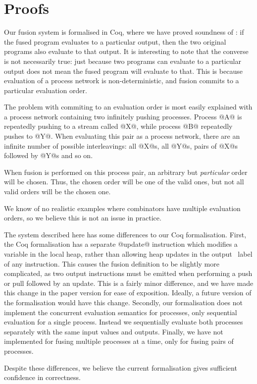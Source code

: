
\section{Proofs}
\label{s:Proofs}

Our fusion system is formalised in Coq, where we have proved soundness of : if the fused program evaluates to a particular output, then the two original programs also evaluate to that output.
It is interesting to note that the converse is not necessarily true: just because two programs can evaluate to a particular output does not mean the fused program will evaluate to that.
This is because evaluation of a process network is non-deterministic, and fusion commits to a particular evaluation order.

The problem with commiting to an evaluation order is most easily explained with a process network containing two infinitely pushing processes.
Process @A@ is repeatedly pushing to a stream called @X@, while process @B@ repeatedly pushes to @Y@.
When evaluating this pair as a process network, there are an infinite number of possible interleavings: all @X@s, all @Y@s, pairs of @X@s followed by @Y@s and so on.

When fusion is performed on this process pair, an arbitrary but \emph{particular} order will be chosen.
Thus, the chosen order will be one of the valid ones, but not all valid orders will be the chosen one.

We know of no realistic examples where combinators have multiple evaluation orders, so we believe this is not an issue in practice.

The system described here has some differences to our Coq formalisation.
First, the Coq formalisation has a separate @update@ instruction which modifies a variable in the local heap, rather than allowing heap updates in the output \Next~label of any instruction.
This causes the fusion definition to be slightly more complicated, as two output instructions must be emitted when performing a push or pull followed by an update.
This is a fairly minor difference, and we have made this change in the paper version for ease of exposition.
Ideally, a future version of the formalisation would have this change.
Secondly, our formalisation does not implement the concurrent evaluation semantics for processes, only sequential evaluation for a single process.
Instead we sequentially evaluate both processes separately with the same input values and outputs.
Finally, we have not implemented  for fusing multiple processes at a time, only  for fusing pairs of processes.

Despite these differences, we believe the current formalisation gives sufficient confidence in correctness.

